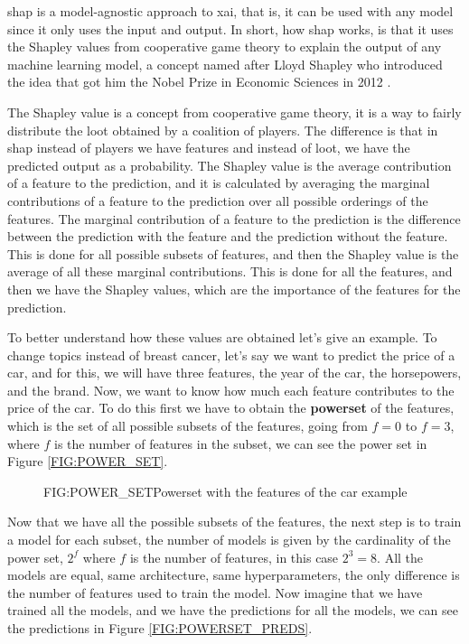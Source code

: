 
\ac{shap} \cite{lundberg_unified_2017} is a model-agnostic approach to \ac{xai}, that is, it can be used with any model since it only uses the input and output. In short, how \ac{shap} works, is that it uses the Shapley values from cooperative game theory to explain the output of any machine learning model, a concept named after Lloyd Shapley who introduced the idea that got him the Nobel Prize in Economic Sciences in 2012 \cite{roth_shapley_1988}.

The Shapley value is a concept from cooperative game theory, it is a way to fairly distribute the loot obtained by a coalition of players. The difference is that in \ac{shap} instead of players we have features and instead of loot, we have the predicted output as a probability. The Shapley value is the average contribution of a feature to the prediction, and it is calculated by averaging the marginal contributions of a feature to the prediction over all possible orderings of the features. The marginal contribution of a feature to the prediction is the difference between the prediction with the feature and the prediction without the feature. This is done for all possible subsets of features, and then the Shapley value is the average of all these marginal contributions. This is done for all the features, and then we have the Shapley values, which are the importance of the features for the prediction.

To better understand how these values are obtained let's give an example. To change topics instead of breast cancer, let's say we want to predict the price of a car, and for this, we will have three features, the year of the car, the horsepowers, and the brand. Now, we want to know how much each feature contributes to the price of the car. To do this first we have to obtain the \textbf{powerset} of the features, which is the set of all possible subsets of the features, going from $f=0$ to $f=3$, where $f$ is the number of features in the subset, we can see the power set in Figure \ref{FIG:POWER_SET}.

\begin{figure}[Powerset Example]{FIG:POWER_SET}{Powerset with the features of the car example}
\end{figure}

Now that we have all the possible subsets of the features, the next step is to train a model for each subset, the number of models is given by the cardinality of the power set, $2^f$ where $f$ is the number of features, in this case $2^3=8$. All the models are equal, same architecture, same hyperparameters, the only difference is the number of features used to train the model. Now imagine that we have trained all the models, and we have the predictions for all the models, we can see the predictions in Figure \ref{FIG:POWERSET_PREDS}.

